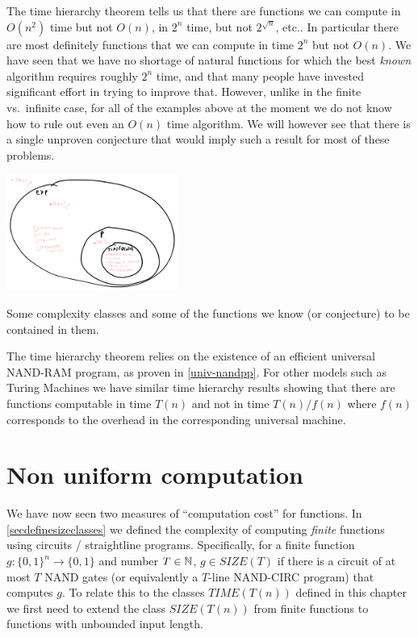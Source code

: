 The time hierarchy theorem tells us that there are functions we can
compute in \(O(n^2)\) time but not \(O(n)\), in \(2^n\) time, but not
\(2^{\sqrt{n}}\), etc.. In particular there are most definitely
functions that we can compute in time \(2^n\) but not \(O(n)\). We have
seen that we have no shortage of natural functions for which the best
\emph{known} algorithm requires roughly \(2^n\) time, and that many
people have invested significant effort in trying to improve that.
However, unlike in the finite vs.~infinite case, for all of the examples
above at the moment we do not know how to rule out even an \(O(n)\) time
algorithm. We will however see that there is a single unproven
conjecture that would imply such a result for most of these problems.


\begin{marginfigure}
\centering
\includegraphics[width=\linewidth, height=1.5in, keepaspectratio]{../figure/time_complexity_map.png}
\caption{Some complexity classes and some of the functions we know (or
conjecture) to be contained in them.}
\label{complexityclassinclusionfig}
\end{marginfigure}

The time hierarchy theorem relies on the existence of an efficient
universal NAND-RAM program, as proven in \cref{univ-nandpp}. For other
models such as Turing Machines we have similar time hierarchy results
showing that there are functions computable in time \(T(n)\) and not in
time \(T(n)/f(n)\) where \(f(n)\) corresponds to the overhead in the
corresponding universal machine.

\section{Non uniform computation}\label{nonuniformcompsec}

We have now seen two measures of ``computation cost'' for functions. In
\cref{secdefinesizeclasses} we defined the complexity of computing
\emph{finite} functions using circuits / straightline programs.
Specifically, for a finite function \(g:\{0,1\}^n \rightarrow \{0,1\}\)
and number \(T\in {\mathbb{N}}\), \(g\in \ensuremath{\mathit{SIZE}}(T)\) if there
is a circuit of at most \(T\) NAND gates (or equivalently a \(T\)-line
NAND-CIRC program) that computes \(g\). To relate this to the classes
\(\ensuremath{\mathit{TIME}}(T(n))\) defined in this chapter we first
need to extend the class \(\ensuremath{\mathit{SIZE}}(T(n))\) from
finite functions to functions with unbounded input length.

